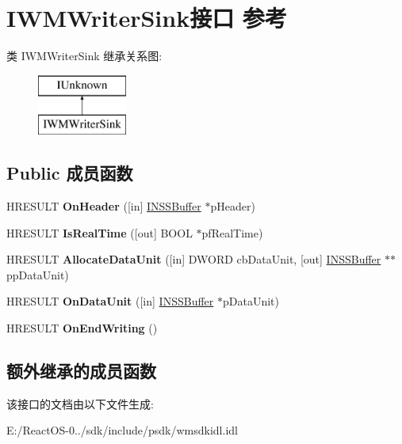 \hypertarget{interface_i_w_m_writer_sink}{}\section{I\+W\+M\+Writer\+Sink接口 参考}
\label{interface_i_w_m_writer_sink}
类 I\+W\+M\+Writer\+Sink 继承关系图\+:\begin{figure}[H]
\begin{center}
\leavevmode
\includegraphics[height=2.000000cm]{interface_i_w_m_writer_sink}
\end{center}
\end{figure}
\subsection*{Public 成员函数}
\begin{DoxyCompactItemize}
\item 
\mbox{\label{interface_i_w_m_writer_sink_ac0401116154a5faaf6ae0432e5f788ac}} 
H\+R\+E\+S\+U\+LT {\bfseries On\+Header} (\mbox{[}in\mbox{]} \hyperlink{interface_i_n_s_s_buffer}{I\+N\+S\+S\+Buffer} $\ast$p\+Header)
\item 
\mbox{\label{interface_i_w_m_writer_sink_a2c3706011edd9c6aca03a39154e9da5f}} 
H\+R\+E\+S\+U\+LT {\bfseries Is\+Real\+Time} (\mbox{[}out\mbox{]} B\+O\+OL $\ast$pf\+Real\+Time)
\item 
\mbox{\label{interface_i_w_m_writer_sink_a00192d385a221513fd1a56870fea2078}} 
H\+R\+E\+S\+U\+LT {\bfseries Allocate\+Data\+Unit} (\mbox{[}in\mbox{]} D\+W\+O\+RD cb\+Data\+Unit, \mbox{[}out\mbox{]} \hyperlink{interface_i_n_s_s_buffer}{I\+N\+S\+S\+Buffer} $\ast$$\ast$pp\+Data\+Unit)
\item 
\mbox{\label{interface_i_w_m_writer_sink_a06c9aa51a06e714be61eb9ff525a3b88}} 
H\+R\+E\+S\+U\+LT {\bfseries On\+Data\+Unit} (\mbox{[}in\mbox{]} \hyperlink{interface_i_n_s_s_buffer}{I\+N\+S\+S\+Buffer} $\ast$p\+Data\+Unit)
\item 
\mbox{\label{interface_i_w_m_writer_sink_ae3a52680997f2fb5c33d1b89d9b1f169}} 
H\+R\+E\+S\+U\+LT {\bfseries On\+End\+Writing} ()
\end{DoxyCompactItemize}
\subsection*{额外继承的成员函数}


该接口的文档由以下文件生成\+:\begin{DoxyCompactItemize}
\item 
E\+:/\+React\+O\+S-\/0../sdk/include/psdk/wmsdkidl.\+idl\end{DoxyCompactItemize}
